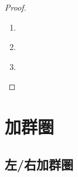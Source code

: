 \documentclass[TQFT_main]{subfiles}
\begin{document}
\begin{proof}
    \begin{enumerate}
        \item ~\cite[PROPOSITION 1.11.2., p.15]{etingof2015tensor}
        \item ~\cite[PROPOSITION 1.11.2., p.15]{etingof2015tensor}
        \item ~\cite[PROPOSITION 4.6.1., p.73]{etingof2015tensor}
    \end{enumerate}
    
\end{proof}

\section{加群圏}

\subsection{左/右加群圏}
\end{document}
